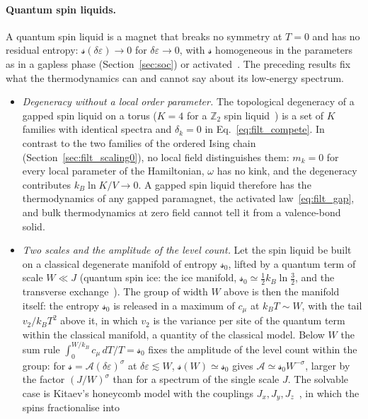 \documentclass[10pt,a4paper]{article}
\theoremstyle{plain}
\newcommand{\lds}{\mathscr{s}}  %
\begin{document}
\paragraph{Quantum spin liquids.} A quantum spin liquid is a magnet that
breaks no symmetry at $T=0$ and has no residual entropy:
$\lds(\delta\varepsilon)\to0$ for $\delta\varepsilon\to0$, with
$\lds$ homogeneous in the parameters as in a gapless phase
(Section~\ref{sec:soc}) or activated~\cite{SavaryBalents2017}. The
preceding results fix what the thermodynamics can and cannot say about
its low-energy spectrum.
\begin{itemize}\setlength{\itemsep}{0pt}
\item \emph{Degeneracy without a local order parameter.} The
  topological degeneracy of a gapped spin liquid on a torus ($K=4$ for a
  $\mathbb Z_2$ spin liquid~\cite{Kitaev2006}) is a set of $K$ families
  with identical spectra and $\delta_k=0$ in Eq.~\eqref{eq:filt_compete}.
  In contrast to the two families of the ordered Ising chain
  (Section~\ref{sec:filt_scaling0}), no local field distinguishes them:
  $m_k=0$ for every local parameter of the Hamiltonian, $\omega$ has no
  kink, and the degeneracy contributes $k_B\ln K/V\to0$. A gapped spin
  liquid therefore has the thermodynamics of any gapped paramagnet, the
  activated law~\eqref{eq:filt_gap}, and bulk thermodynamics at zero field
  cannot tell it from a valence-bond solid.
\item \emph{Two scales and the amplitude of the level count.} Let the
  spin liquid be built on a classical degenerate manifold of entropy
  $\lds_0$, lifted by a quantum term of scale $W\ll J$ (quantum spin ice:
  the ice manifold, $\lds_0\simeq\tfrac12k_B\ln\tfrac32$, and the
  transverse exchange~\cite{Hermele2004,Gingras2014}). The group of width
  $W$ above is then the manifold itself: the entropy $\lds_0$ is released
  in a maximum of $c_\mu$ at $k_BT\sim W$, with the tail $v_2/k_BT^{2}$
  above it, in which $v_2$ is the variance per site of the quantum term
  within the classical manifold, a quantity of the classical model. Below
  $W$ the sum rule $\int_0^{W/k_B}c_\mu\,dT/T=\lds_0$ fixes the amplitude of
  the level count within the group: for
  $\lds=\mathcal A(\delta\varepsilon)^{\sigma}$ at $\delta\varepsilon\lesssim W$,
  $\lds(W)\simeq\lds_0$ gives $\mathcal A\simeq\lds_0W^{-\sigma}$, larger by
  the factor $(J/W)^{\sigma}$ than for a spectrum of the single scale $J$.
  The solvable case is Kitaev's honeycomb model with the couplings
  $J_x,J_y,J_z$~\cite{Kitaev2006}, in which the spins fractionalise into

\end{itemize}
\end{document}
